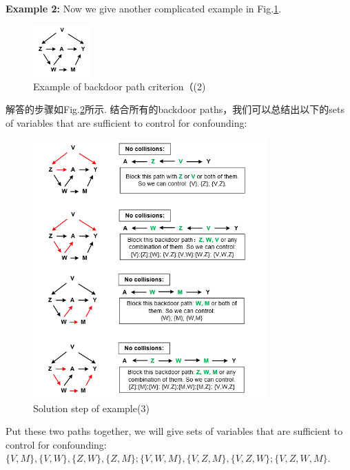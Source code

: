 {\bfseries Example 2:} 
Now we give another complicated example in Fig.\ref{bckdrcrtex3}.
\begin{figure}[h]
	\setlength{\abovecaptionskip}{0pt}     %
	\setlength{\belowcaptionskip}{10pt}
	\vspace{-0cm}  %
	\setlength{\abovecaptionskip}{-0cm}   %
	\setlength{\belowcaptionskip}{-0cm}   %
	\centering
	\includegraphics[width=0.2\textwidth]{figure/bckdrcrtex3.png}
	\caption{Example of backdoor path criterion（(2)}
	\label{bckdrcrtex3}
\end{figure}
解答的步骤如Fig.\ref{answerbckdrcrtex3}所示. 结合所有的backdoor paths，我们可以总结出以下的sets of variables that are sufficient to control for confounding:

\begin{figure}[htbp]
	\setlength{\abovecaptionskip}{0pt}     %
	\setlength{\belowcaptionskip}{10pt}
	\vspace{-0cm}  %
	\setlength{\abovecaptionskip}{-0cm}   %
	\setlength{\belowcaptionskip}{-0cm}   %
	\centering
	\includegraphics[width=0.8\textwidth]{figure/answerbckdrcrtex3.png}
	\caption{Solution step of example(3)}
	\label{answerbckdrcrtex3}
\end{figure}
Put these two paths together, we will give   sets of variables that are sufficient to control for confounding:$\{V,M\},\{V,W\},\{Z,W\},\{Z,M\}; \{V,W,M\},\{V,Z,M\},\{V,Z,W\}; \{V,Z,W,M\}$.



